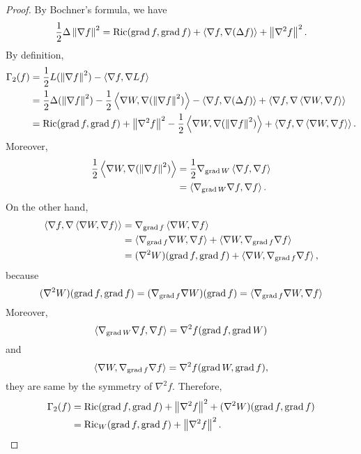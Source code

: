 \begin{proof}
    By Bochner’s formula, we have
    \begin{equation*}
        \frac{1}{2} \Delta \left\lVert\nabla f\right\lVert^2 = \operatorname{Ric}(\operatorname{grad}f,\operatorname{grad}f) + \left\langle \nabla f, \nabla (\Delta f) \right\rangle + \left\lVert\nabla^2 f\right\lVert^2.
    \end{equation*}
    By definition,
    \begin{align*}
        \Gamma_2(f) &= \frac{1}{2} L (\left\lVert\nabla f\right\lVert^2) - \left\langle \nabla f, \nabla Lf \right\rangle \\
        &= \frac{1}{2} \Delta (\left\lVert\nabla f\right\lVert^2) - \frac{1}{2}\left\langle \nabla W, \nabla (\left\lVert\nabla f\right\lVert^2) \right\rangle - \left\langle \nabla f, \nabla (\Delta f) \right\rangle + \left\langle \nabla f, \nabla \left\langle \nabla W, \nabla f \right\rangle \right\rangle \\
        &= \operatorname{Ric}(\operatorname{grad}f,\operatorname{grad}f) + \left\lVert\nabla^2 f\right\lVert^2  -  \frac{1}{2}\left\langle \nabla W, \nabla (\left\lVert\nabla f\right\lVert^2) \right\rangle + \left\langle \nabla f, \nabla \left\langle \nabla W, \nabla f \right\rangle \right\rangle.
    \end{align*}
    Moreover,
    \begin{align*}
        \frac{1}{2}\left\langle \nabla W, \nabla (\left\lVert\nabla f\right\lVert^2) \right\rangle &= \frac{1}{2}\nabla_{\operatorname{grad} W} \left\langle \nabla f, \nabla f \right\rangle \\
        &= \left\langle \nabla_{\operatorname{grad} W}\nabla f, \nabla f \right\rangle.
    \end{align*}
    On the other hand,
    \begin{align*}
        \left\langle \nabla f, \nabla \left\langle \nabla W, \nabla f \right\rangle \right\rangle &= \nabla_{\operatorname{grad} f} \left\langle \nabla W, \nabla f \right\rangle \\
        &= \left\langle \nabla_{\operatorname{grad} f}\nabla W, \nabla f \right\rangle + \left\langle \nabla W, \nabla_{\operatorname{grad} f}\nabla f \right\rangle \\
        &= (\nabla^2 W)(\operatorname{grad} f,\operatorname{grad} f) + \left\langle \nabla W, \nabla_{\operatorname{grad} f}\nabla f \right\rangle,
    \end{align*}
    because
    \begin{equation*}
        (\nabla^2 W)(\operatorname{grad} f,\operatorname{grad} f) = (\nabla_{\operatorname{grad} f} \nabla W)(\operatorname{grad} f) = \left\langle \nabla_{\operatorname{grad} f} \nabla W, \nabla f \right\rangle
    \end{equation*}
    Moreover,
    \begin{equation*}
        \left\langle \nabla_{\operatorname{grad} W}\nabla f, \nabla f \right\rangle = \nabla^2f(\operatorname{grad}f,\operatorname{grad}W)
    \end{equation*}
    and
    \begin{equation*}
        \left\langle \nabla W, \nabla_{\operatorname{grad} f}\nabla f \right\rangle = \nabla^2f(\operatorname{grad}W,\operatorname{grad} f),
    \end{equation*}
    they are same by the symmetry of $\nabla^2 f$. Therefore,
    \begin{align*}
        \Gamma_2(f) &= \operatorname{Ric}(\operatorname{grad}f,\operatorname{grad}f) + \left\lVert\nabla^2 f\right\lVert^2 + (\nabla^2 W)(\operatorname{grad} f,\operatorname{grad} f) \\
        &=\operatorname{Ric}_W(\operatorname{grad}f,\operatorname{grad}f) + \left\lVert\nabla^2 f\right\lVert^2. \qedhere
    \end{align*}
\end{proof}

